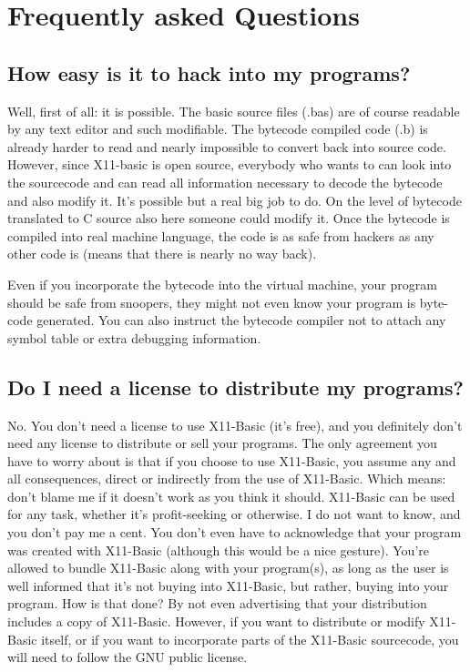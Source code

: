 
\chapter{Frequently asked Questions}

\section*{How easy is it to hack into my programs?}

Well, first of all: it is possible. The basic source files (.bas) are of course
readable by any text editor and such modifiable. The bytecode compiled code (.b)
is already harder to read and nearly impossible to convert back into source
code. However, since X11-basic is open source, everybody who wants to can look
into the sourcecode and can read all information necessary to decode the
bytecode and also modify it. It's possible but a real big job to do. On the level
of bytecode translated to C source also here someone could modify it. Once the
bytecode is compiled into real machine language, the code is as safe from
hackers as any other code is (means that there is nearly no way back). 

Even if you incorporate the bytecode into the virtual machine, your program
should be safe from snoopers, they might not even know your program is byte-code
generated. You can also instruct the bytecode compiler not to attach any symbol
table or extra debugging information.


\section*{Do I need a license to distribute my programs?}

No. You don't need a license to use X11-Basic (it's free), and you definitely
don't need any license to distribute or sell your programs. The only agreement
you have to worry about is that if you choose to use X11-Basic, you assume any
and all consequences, direct or indirectly from the use of X11-Basic. Which
means: don't blame me if it doesn't work as you think it should. X11-Basic can
be used for any task, whether it's profit-seeking or otherwise. I do not want to
know, and you don't pay me a cent. You don't even have to acknowledge that your
program was created with X11-Basic (although this would be a nice gesture).
You're allowed to bundle X11-Basic along with your program(s), as long as the
user is well informed that it's not buying into X11-Basic, but rather, buying
into your program. How is that done? By not even advertising that your
distribution includes a copy of X11-Basic. However, if you want to distribute or
modify X11-Basic itself, or if you want to incorporate parts of the X11-Basic 
sourcecode, you will need to follow the GNU public license. 

